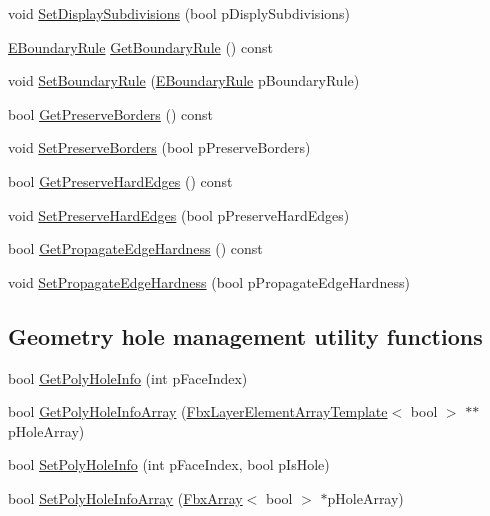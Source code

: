 \begin{DoxyCompactItemize}
\item 
void \hyperlink{class_fbx_mesh_ae9cf093a067ebc761231f1f186695d67}{Set\+Display\+Subdivisions} (bool p\+Disply\+Subdivisions)
\item 
\hyperlink{class_fbx_mesh_ab9e7d41ffcd49467a374c72e0d6f3561}{E\+Boundary\+Rule} \hyperlink{class_fbx_mesh_a14ac6bb49f273e5a57301a22c0957025}{Get\+Boundary\+Rule} () const
\item 
void \hyperlink{class_fbx_mesh_a36ab48a31065c607af8ad8a554fab6c6}{Set\+Boundary\+Rule} (\hyperlink{class_fbx_mesh_ab9e7d41ffcd49467a374c72e0d6f3561}{E\+Boundary\+Rule} p\+Boundary\+Rule)
\item 
bool \hyperlink{class_fbx_mesh_aa2ee9371868bd2cf625f96e31ef44577}{Get\+Preserve\+Borders} () const
\item 
void \hyperlink{class_fbx_mesh_a462b090d01499b85ed9b19f42cdcef76}{Set\+Preserve\+Borders} (bool p\+Preserve\+Borders)
\item 
bool \hyperlink{class_fbx_mesh_a93c3cec3811368e69f968b9e84a96a31}{Get\+Preserve\+Hard\+Edges} () const
\item 
void \hyperlink{class_fbx_mesh_adfaa804cd76983fc6a2603aef0c25acd}{Set\+Preserve\+Hard\+Edges} (bool p\+Preserve\+Hard\+Edges)
\item 
bool \hyperlink{class_fbx_mesh_a146004786d53607346507bef4bd12101}{Get\+Propagate\+Edge\+Hardness} () const
\item 
void \hyperlink{class_fbx_mesh_a1908668e29bfe832de7eec520d0d5cba}{Set\+Propagate\+Edge\+Hardness} (bool p\+Propagate\+Edge\+Hardness)
\end{DoxyCompactItemize}
\subsection*{Geometry hole management utility functions}
\begin{DoxyCompactItemize}
\item 
bool \hyperlink{class_fbx_mesh_aefe03c32a3743332101cdcbac963d64b}{Get\+Poly\+Hole\+Info} (int p\+Face\+Index)
\item 
bool \hyperlink{class_fbx_mesh_a8b512771bbaf8243e24e649d253003a3}{Get\+Poly\+Hole\+Info\+Array} (\hyperlink{class_fbx_layer_element_array_template}{Fbx\+Layer\+Element\+Array\+Template}$<$ bool $>$ $\ast$$\ast$p\+Hole\+Array)
\item 
bool \hyperlink{class_fbx_mesh_af13ce6ba20ce1920120a8b7b6d6854ed}{Set\+Poly\+Hole\+Info} (int p\+Face\+Index, bool p\+Is\+Hole)
\item 
bool \hyperlink{class_fbx_mesh_ae1392c998ffe508d66284c5615b17f15}{Set\+Poly\+Hole\+Info\+Array} (\hyperlink{class_fbx_array}{Fbx\+Array}$<$ bool $>$ $\ast$p\+Hole\+Array)
\end{DoxyCompactItemize}
